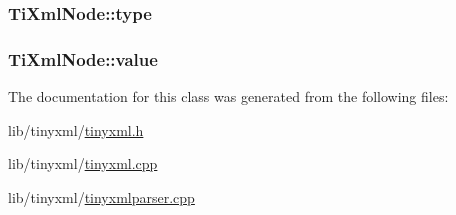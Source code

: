 \hypertarget{class_ti_xml_node_a2619c6379181c16ba95ae6922e2ca839}{
\subsubsection[{type}]{ Ti\-Xml\-Node\-::type\hspace{0.3cm}{\ttfamily [protected]}}}\label{class_ti_xml_node_a2619c6379181c16ba95ae6922e2ca839}
\hypertarget{class_ti_xml_node_aead528b3cedc33c16a6c539872c7cc8b}{
\subsubsection[{value}]{ Ti\-Xml\-Node\-::value\hspace{0.3cm}{\ttfamily [protected]}}}\label{class_ti_xml_node_aead528b3cedc33c16a6c539872c7cc8b}


The documentation for this class was generated from the following files\-:\begin{DoxyCompactItemize}
\item 
lib/tinyxml/\hyperlink{tinyxml_8h}{tinyxml.\-h}\item 
lib/tinyxml/\hyperlink{tinyxml_8cpp}{tinyxml.\-cpp}\item 
lib/tinyxml/\hyperlink{tinyxmlparser_8cpp}{tinyxmlparser.\-cpp}\end{DoxyCompactItemize}
